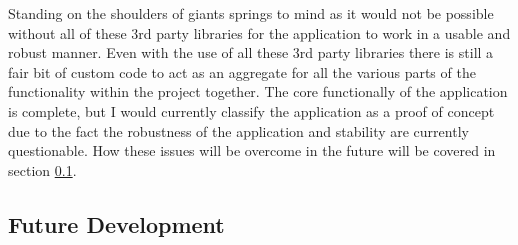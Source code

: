 \noindent
Standing on the shoulders of giants springs to mind as it would not be possible without all of these 3rd party libraries for the application to work in a usable and robust manner. Even with the use of all these 3rd party libraries there is still a fair bit of custom code to act as an aggregate for all the various parts of the functionality within the project together. The core functionally of the application is complete, but I would currently classify the application as a proof of concept due to the fact the robustness of the application and stability are currently questionable. How these issues will be overcome in the future will be covered in section \ref{sec:development_future_dev}.\\

\subsection{Future Development}
\label{sec:development_future_dev}

